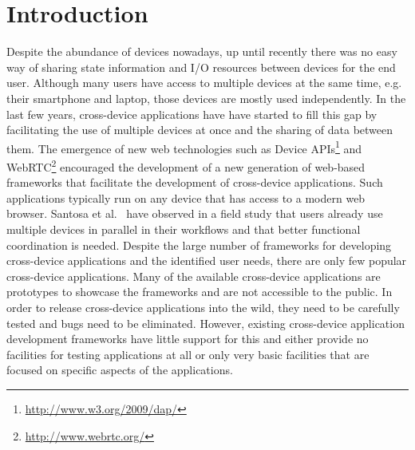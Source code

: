 \chapter{Introduction}

Despite the abundance of devices nowadays, up until recently there was no easy way of sharing state information and I/O resources between devices for the end user. Although many users have access to multiple devices at the same time, e.g. their smartphone and laptop, those devices are mostly used independently. In the last few years, cross-device applications have have started to fill this gap by facilitating the use of multiple devices at once and the sharing of data between them. The emergence of new web technologies such as Device APIs\footnote{\url{http://www.w3.org/2009/dap/}} and WebRTC\footnote{\url{http://www.webrtc.org/}} encouraged the development of a new generation of web-based frameworks that facilitate the development of cross-device applications. Such applications typically run on any device that has access to a modern web browser. Santosa et al.~\cite{santosa2013} have observed in a field study that users already use multiple devices in parallel in their workflows and that better functional coordination is needed. Despite the large number of frameworks for developing cross-device applications and the identified user needs, there are only few popular cross-device applications. Many of the available cross-device applications are prototypes to showcase the frameworks and are not accessible to the public. In order to release cross-device applications into the wild, they need to be carefully tested and bugs need to be eliminated. However, existing cross-device application development frameworks have little support for this and either provide no facilities for testing applications at all or only very basic facilities that are focused on specific aspects of the applications.  


